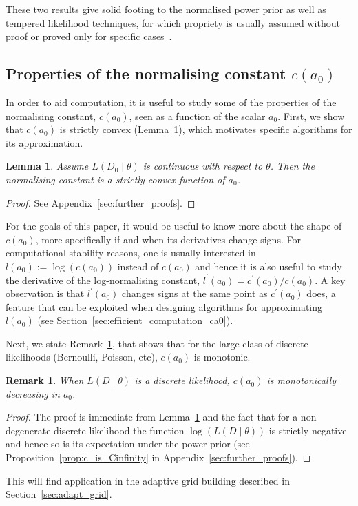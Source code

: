 \documentclass[a4paper, notitlepage, 11pt]{article}
\newtheorem{lemma}{Lemma}[]
\newtheorem{remark}{Remark}[]
\begin{document}
These two results give solid footing to the normalised power prior as well as tempered likelihood techniques, for which propriety is usually assumed without proof or proved only for specific cases~\citep{Duan2006a, Savitsky2016}.

\subsection{Properties of the normalising constant $c(a_0)$}
\label{sec:properties}

In order to aid computation, it is useful to study some of the properties of the normalising constant, $c(a_0)$, seen as a function of the scalar $a_0$. 
First, we show that  $c(a_0)$ is strictly convex (Lemma~\ref{lm:convex_norm_constant}), which motivates specific algorithms for its approximation.

\begin{lemma}
\label{lm:convex_norm_constant}
Assume $L(D_0 \mid \theta)$ is continuous with respect to $\theta$.
Then the normalising constant is a strictly convex function of $a_0$.
\end{lemma}
\begin{proof}\let\qed\relax
See Appendix~\ref{sec:further_proofs}.
\end{proof}

For the goals of this paper, it would be useful to know more about the shape of $c(a_0)$, more specifically if and when its derivatives change signs.
For computational stability reasons, one is usually interested in $l(a_0) := \log(c(a_0)) $ instead of $c(a_0)$ and hence it is also useful to study the derivative of the log-normalising constant, $l^\prime(a_0) = c^\prime(a_0)/c(a_0)$.
A key observation is that $l^\prime(a_0)$ changes signs at the same point as $c^\prime(a_0)$ does, a feature that can be exploited when designing algorithms for approximating $l(a_0)$ (see Section~\ref{sec:efficient_computation_ca0}).

Next, we state Remark~\ref{rmk:discrete_decreasing}, that shows that for the large class of discrete likelihoods (Bernoulli, Poisson, etc), $c(a_0)$ is monotonic.
\begin{remark}
 \label{rmk:discrete_decreasing}
 When $L(D \mid \theta)$ is a discrete likelihood, $c(a_0)$ is monotonically decreasing in $a_0$.
\end{remark}
\begin{proof}
 The proof is immediate from Lemma~\ref{lm:convex_norm_constant} and the fact that for a non-degenerate discrete likelihood the function $\log(L(D\mid\theta))$ is strictly negative and hence so is its expectation under the power prior (see Proposition~\ref{prop:c_is_Cinfinity} in Appendix~\ref{sec:further_proofs}).
\end{proof}
This will find application in the adaptive grid building described in Section~\ref{sec:adapt_grid}.
\end{document}
